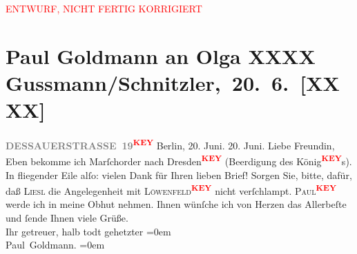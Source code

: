 
\begin{center}
            \textcolor{red}{ENTWURF, NICHT FERTIG KORRIGIERT}
                      \end{center}
            
         
         \renewcommand{\erwaehntePersonen}{Personen: Olga Schnitzler, Elisabeth Steinrück}
         \renewcommand{\erwaehnteOrte}{Orte: Berlin, Wien}
         \renewcommand{\erwaehnteWerke}{}
               \section[ Paul Goldmann an Olga XXXX Gussmann/Schnitzler, 20. 6. {[}XXXX{]}]{ Paul Goldmann an Olga XXXX Gussmann/Schnitzler, 20. 6. {[}XXXX{]}}\nopagebreak{}\rehead{ }\begin{ledgroupsized}[t]{13cm}\normalsize\beginnumbering \toendnotes[C]{\smallbreak\pagebreak[2]} 
\textcolor{gray}{\textbf{DESSAUERSTRASSE 19}}\textcolor{red}{\textsuperscript{\textbf{KEY}}}\pstart
           Berlin, 20. Juni. 20.
                     Juni.\pend
           \pstart{}Liebe Freundin,\pend\pstart
           \pend
           \pstart
           Eben bekomme ich Marſchorder nach Dresden\textcolor{red}{\textsuperscript{\textbf{KEY}}}
               (Beerdigung des König\textcolor{red}{\textsuperscript{\textbf{KEY}}}s). In fliegender Eile alſo:
               vielen Dank für Ihren lieben Brief! Sorgen Sie, bitte, dafür, daß \textsc{Liesl} die Angelegenheit mit \textsc{Löwenfeld\textcolor{red}{\textsuperscript{\textbf{KEY}}}} nicht verſchlampt. \textsc{Paul\textcolor{red}{\textsuperscript{\textbf{KEY}}}} werde ich in meine Obhut nehmen. Ihnen wünſche ich von Herzen das Allerbeſte
               und ſende Ihnen viele Grüße. {\\[\baselineskip]}Ihr getreuer, halb todt gehetzter\pend
           \leftskip=0em{}\pstart
           {\\[\baselineskip]}\spacefill\mbox{Paul Goldmann.}\pend
           \leftskip=0em{}
         
         \endnumbering{}\end{ledgroupsized}\begin{anhang}\end{anhang}\newcommand{\dateiname}{L03531}\newcommand{\titel}{Paul Goldmann an Olga XXXX Gussmann/Schnitzler, 20. 6. [XXXX]}\newcommand{\editorInnen}{Martin Anton Müller und Laura Untner}
      